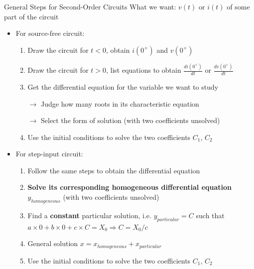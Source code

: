 \documentclass{beamer}
\begin{document}
\begin{frame}{General Steps for Second-Order Circuits}
What we want: $v(t)$ or $i(t)$ of some part of the circuit
\begin{itemize}
    \item For source-free circuit:
    \begin{enumerate}
        \item Draw the circuit for $t < 0$, obtain $i(0^+)$ and $v(0^+)$
        \item Draw the circuit for $t>0$, list equations to obtain $\frac{di(0^+)}{dt}$ or $\frac{dv(0^+)}{dt}$
        \item Get the differential equation for the variable we want to study 
        
        $\longrightarrow$ Judge how many roots in its characteristic equation

        $\longrightarrow$ Select the form of solution (with two coefficients unsolved)

        \item Use the initial conditions to solve the two coefficients $C_1$, $C_2$
    \end{enumerate}

    \item For step-input circuit:
    \begin{enumerate}
        \item Follow the same steps to obtain the differential equation
        \item \textbf{Solve its corresponding homogeneous differential equation $y_{homogeneous}$} (with two coefficients unsolved)
        \item Find a \textbf{constant} particular solution, i.e. $y_{particular} = C$ such that $a\times 0 + b\times 0 + c \times C = X_0 \Rightarrow C = X_0/c$
        \item General solution $x = x_{homogeneous} + x_{particular}$
        \item Use the initial conditions to solve the two coefficients $C_1$, $C_2$ 
    \end{enumerate}
    
\end{itemize}
    
\end{frame}

\end{document}
